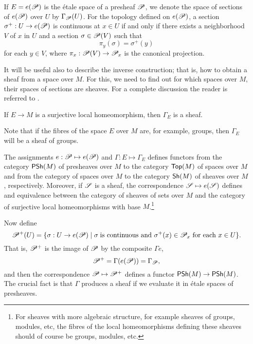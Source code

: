 If $E=e(\mathscr{P})$ is the \'etale space of a presheaf $\mathscr{P}$, we denote the space of sections of $e(\mathscr{P})$ over $U$ by $\Gamma_{\mathscr{P}}(U)$. For the topology defined on $e(\mathscr{P})$, a section $\sigma^+ :U\to e(\mathscr{P})$ is continuous at $x\in U$ if and only if there exists a neighborhood $V$ of $x$ in $U$ and a section $\sigma \in \mathscr{P}(V)$ such that
$$\pi_y(\sigma )=\sigma^+(y)$$
for each $y\in V$, where $\pi_x:\mathscr{P}(V)\to \mathscr{P}_x$ is the canonical projection.

It will be useful also to describe the inverse construction; that is, how to obtain a sheaf from a space over $M$. For this, we need to find out for which spaces over $M$, their spaces of sections are sheaves. For a complete discussion the reader is referred to \cite{tennison:_sheaf}.

\begin{proposition}\label{loc_homeo_sheaf}
If $E\to M$ is a surjective local homeomorphism, then $\Gamma_E$ is a sheaf.
\end{proposition}

\begin{obs}
Note that if the fibres of the space $E$ over $M$ are, for example, groups, then $\Gamma_E$ will be a sheaf of groups.
\end{obs}

\begin{proposition}
The assignments $e:\mathscr{P}\mapsto e(\mathscr{P})$ and $\Gamma:E\mapsto \Gamma_E$ defines functors from the category $\mathsf{PSh}(M)$ of presheaves over $M$ to the category $\mathsf{Top}(M)$ of spaces over $M$ and from the category of spaces over $M$ to the category $\mathsf{Sh}(M)$ of sheaves over $M$, respectively. Moreover, if $\mathscr{S}$ is a sheaf, the correspondence $\mathscr{S}\mapsto e(\mathscr{S})$ defines and equivalence between the category of sheaves of sets over $M$ and the category of surjective local homeomorphisms with base $M$.\footnote{For sheaves with more algebraic structure, for example sheaves of groups, modules, etc, the fibres of the local homeomorphisms defining these sheaves should of course be groups, modules, etc.}
\end{proposition}

Now define
$$\mathscr{P}^+(U)=\{\sigma :U\to e(\mathscr{P})\; | \; \sigma \; \text{is continuous and $\sigma^+(x)\in \mathscr{P}_x$ for each $x\in U$}\}.$$
That is, $\mathscr{P}^+$ is the image of $\mathscr{P}$ by the composite $\Gamma e$,
$$\mathscr{P}^+=\Gamma (e(\mathscr{P}))=\Gamma_{\mathscr{P}},$$
and then the correspondence $\mathscr{P}\mapsto \mathscr{P}^+$ defines a functor $\mathsf{PSh}(M)\to \mathsf{PSh}(M)$. The crucial fact is that $\Gamma$ produces a sheaf if we evaluate it in \'etale spaces of presheaves.


